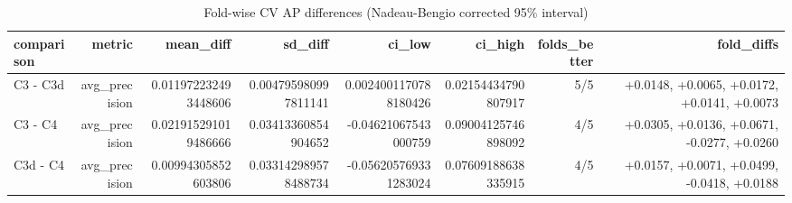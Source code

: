 \begin{table}[htbp]
\centering
\small
\caption{Fold-wise CV AP differences (Nadeau-Bengio corrected 95\% interval)}
\begin{tabular}{lrrrrrrr}
\toprule
comparison & metric & mean\_diff & sd\_diff & ci\_low & ci\_high & folds\_better & fold\_diffs \\
\midrule
C3 - C3d & avg\_precision & 0.011972232493448606 & 0.004795980997811141 & 0.0024001170788180426 & 0.02154434790807917 & 5/5 & +0.0148, +0.0065, +0.0172, +0.0141, +0.0073 \\
C3 - C4 & avg\_precision & 0.021915291019486666 & 0.03413360854904652 & -0.04621067543000759 & 0.09004125746898092 & 4/5 & +0.0305, +0.0136, +0.0671, -0.0277, +0.0260 \\
C3d - C4 & avg\_precision & 0.00994305852603806 & 0.033142989578488734 & -0.056205769331283024 & 0.07609188638335915 & 4/5 & +0.0157, +0.0071, +0.0499, -0.0418, +0.0188 \\
\bottomrule
\end{tabular}
\par\smallskip\begin{minipage}{\linewidth}\footnotesize \end{minipage}
\end{table}

